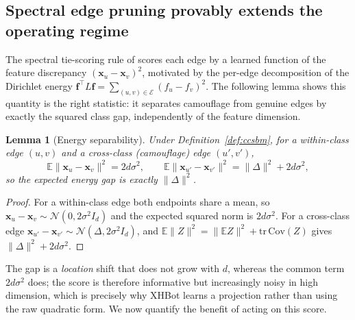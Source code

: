 \documentclass[onecolumn,pdflatex,sn-basic,Numbered]{sn-jnl}
\theoremstyle{thmstyleone}
\newtheorem{lemma}[theorem]{Lemma}
\theoremstyle{thmstylethree}
\begin{document}
\subsection{Spectral edge pruning provably extends the operating regime}
\label{sec:sgtr-theory}

The spectral tie-scoring rule of \citet{dang2026xhbot} scores each edge by a learned function of the feature
discrepancy $(\mathbf{x}_u - \mathbf{x}_v)^2$, motivated by the per-edge
decomposition of the Dirichlet energy $\mathbf{f}^\top L \mathbf{f} =
\sum_{(u,v)\in\mathcal{E}} (f_u-f_v)^2$. The following lemma shows this quantity is
the right statistic: it separates camouflage from genuine edges by exactly the
squared class gap, independently of the feature dimension.

\begin{lemma}[Energy separability]
\label{lem:energy}
Under Definition~\ref{def:ccsbm}, for a within-class edge $(u,v)$ and a
cross-class (camouflage) edge $(u',v')$,
\begin{equation}
    \mathbb{E}\bigl\|\mathbf{x}_u - \mathbf{x}_v\bigr\|^2 = 2d\sigma^2,
    \qquad
    \mathbb{E}\bigl\|\mathbf{x}_{u'} - \mathbf{x}_{v'}\bigr\|^2 = \|\Delta\|^2 + 2d\sigma^2,
\end{equation}
so the expected energy gap is exactly $\|\Delta\|^2$.
\end{lemma}

\begin{proof}
For a within-class edge both endpoints share a mean, so
$\mathbf{x}_u - \mathbf{x}_v \sim \mathcal{N}(0, 2\sigma^2 I_d)$ and the expected
squared norm is $2d\sigma^2$. For a cross-class edge
$\mathbf{x}_{u'} - \mathbf{x}_{v'} \sim \mathcal{N}(\Delta, 2\sigma^2 I_d)$, and
$\mathbb{E}\|Z\|^2 = \|\mathbb{E}Z\|^2 + \mathrm{tr}\,\mathrm{Cov}(Z)$ gives
$\|\Delta\|^2 + 2d\sigma^2$.
\end{proof}

The gap is a \emph{location} shift that does not grow with $d$, whereas the common
term $2d\sigma^2$ does; the score is therefore informative but increasingly noisy in
high dimension, which is precisely why XHBot learns a projection rather than using
the raw quadratic form. We now quantify the benefit of acting on this score.
\end{document}
